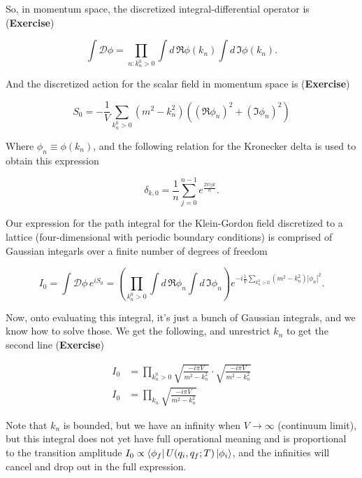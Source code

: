 \noindent So, in momentum space, the discretized integral-differential operator is (\textbf{Exercise})

\begin{equation}
\int \mathcal{D} \phi = \prod_{n: k_n^0 > 0} \int d \, \Re \phi (k_n) \int d \, \Im \phi (k_n).
\end{equation}

\noindent And the discretized action for the scalar field in momentum space is (\textbf{Exercise})

\begin{equation}
S_0 = - \frac{1}{V} \sum_{k_n^0 > 0} (m^2 - k_n^2) ( (\Re \phi_n)^2 + (\Im \phi_n)^2)
\end{equation}

\noindent Where $\phi_n \equiv \phi(k_n)$, and the following relation for the Kronecker delta is used to obtain this expression

\begin{equation}
\delta_{k,0} = \frac{1}{n} \sum_{j=0}^{n-1} e^{\frac{2\pi i j k}{n}}.
\end{equation}

\noindent Our expression for the path integral for the Klein-Gordon field discretized to a lattice (four-dimensional with periodic boundary conditions) is comprised of Gaussian integarls over a finite number of degrees of freedom

\begin{equation}
I_0 = \int \mathcal{D} \phi \, e^{i S_0} = \left( \prod_{k_n^0 > 0} \int d \, \Re \phi_n \int d \, \Im \phi_n \right) e^{-i \frac{1}{V} \sum_{k_n^0 > 0} (m^2 - k_n^2 ) | \phi_n |^2}.
\end{equation}

\noindent Now, onto evaluating this integral, it's just a bunch of Gaussian integrals, and we know how to solve those. We get the following, and unrestrict $k_n$ to get the second line (\textbf{Exercise}) 

\begin{align}
I_0 &= \prod_{k_n^0 > 0} \sqrt{\frac{-i \pi V}{m^2 - k_n^2}} \cdot \sqrt{\frac{-i \pi V}{m^2 - k_n^2}} \\
I_0 &=  \prod_{k_n} \sqrt{\frac{-i \pi V}{m^2 - k_n^2}}
\end{align}

\noindent Note that $k_n$ is bounded, but we have an infinity when $V \rightarrow \infty$ (continuum limit), but this integral does not yet have full operational meaning and is proportional to the transition amplitude $I_0 \propto \bra{\phi_f} U(q_i, q_f; T) \ket{\phi_i}$, and the infinities will cancel and drop out in the full expression. \\

